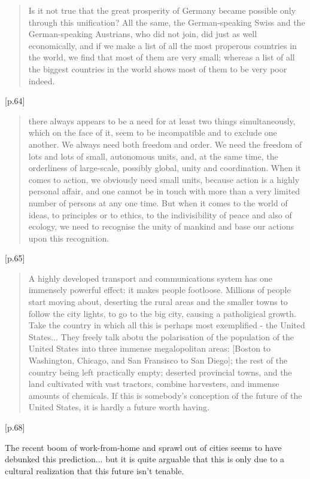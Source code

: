 \documentclass[10pt,letterpaper,openany]{book}
\begin{document}
\begin{quote}
Is it not true that the great prosperity of Germany became possible only through this unification? All the same, the German-speaking Swiss and the German-speaking Austrians, who did not join, did just as well economically, and if we make a list of all the most properous countries in the world, we find that most of them are very small; whereas a list of all the biggest countries in the world shows most of them to be very poor indeed.
\end{quote} [p.64]

\begin{quote}
there always appears to be a need for at least two things simultaneously, which on the face of it, seem to be incompatible and to exclude one another. We always need both freedom and order. We need the freedom of lots and lots of small, autonomous units, and, at the same time, the orderliness of large-scale, possibly global, unity and coordination. When it comes to action, we obviously need small units, because action is a highly personal affair, and one cannot be in touch with more than a very limited number of persons at any one time. But when it comes to the world of ideas, to principles or to ethics, to the indivisibility of peace and also of ecology, we need to recognise the unity of mankind and base our actions upon this recognition.
\end{quote} [p.65]

\begin{quote}
A highly developed transport and communications system has one immensely powerful effect: it makes people footloose. Millions of people start moving about, deserting the rural areas and the smaller towns to follow the city lights, to go to the big city, causing a patholigical growth. Take the country in which all this is perhaps most exemplified - the United States... They freely talk abotu the polarisation of the population of the United States into three immense megalopolitan areas: [Boston to Washington, Chicago, and San Fransisco to San Diego]; the rest of the country being left practically empty; deserted provincial towns, and the land cultivated with vast tractors, combine harvesters, and immense amounts of chemicals. If this is somebody's conception of the future of the United States, it is hardly a future worth having.
\end{quote}[p.68]

The recent boom of work-from-home and sprawl out of cities seems to have debunked this prediction... but it is quite arguable that this is only due to a cultural realization that this future isn't tenable.
\end{document}
